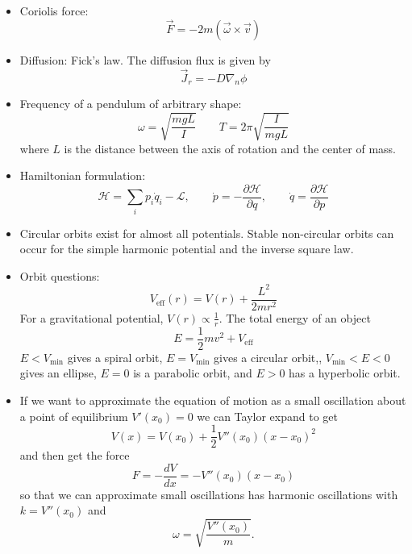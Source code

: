 \documentclass[english]{article}
\begin{document}
\begin{itemize}
\begin{itemize}
\end{itemize}
\item Coriolis force:\[
\vec{F}=-2m(\vec{\omega}\times\vec{v})\]

\item Diffusion: Fick's law. The diffusion flux is given by\[
\vec{J}_{r}=-D\nabla_{n}\phi\]

\item Frequency of a pendulum of arbitrary shape:\[
\omega=\sqrt{\frac{mgL}{I}}\qquad T=2\pi\sqrt{\frac{I}{mgL}}\]
where $L$ is the distance between the axis of rotation and the center
of mass.
\item Hamiltonian formulation:\[
\mathcal{H}=\sum_{i}p_{i}\dot{q}_{i}-\mathcal{L},\qquad\dot{p}=-\frac{\partial\mathcal{H}}{\partial q},\qquad\dot{q}=\frac{\partial\mathcal{H}}{\partial p}\]

\item Circular orbits exist for almost all potentials. Stable non-circular
orbits can occur for the simple harmonic potential and the inverse
square law.
\item Orbit questions:\[
V_{\text{eff}}(r)=V(r)+\frac{L^{2}}{2mr^{2}}\]
For a gravitational potential, $V(r)\propto\frac{1}{r}$. The total
energy of an object\[
E=\frac{1}{2}mv^{2}+V_{\text{eff}}\]
$E<V_{\text{min}}$ gives a spiral orbit, $E=V_{\text{min}}$ gives
a circular orbit,, $V_{\text{min}}<E<0$ gives an ellipse, $E=0$
is a parabolic orbit, and $E>0$ has a hyperbolic orbit.
\item If we want to approximate the equation of motion as a small oscillation
about a point of equilibrium $V'(x_{0})=0$ we can Taylor expand to
get\[
V(x)=V(x_{0})+\frac{1}{2}V''(x_{0})(x-x_{0})^{2}\]
and then get the force \[
F=-\frac{dV}{dx}=-V''(x_{0})(x-x_{0})\]
so that we can approximate small oscillations has harmonic oscillations
with $k=V''(x_{0})$ and\[
\omega=\sqrt{\frac{V''(x_{0})}{m}}.\]

\end{itemize}
\end{document}
